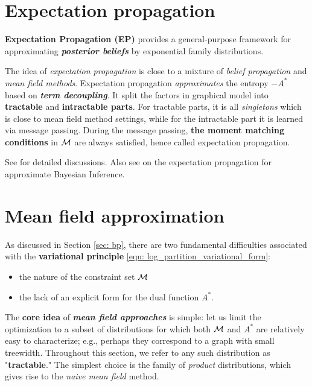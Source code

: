 \documentclass[11pt]{article}
\begin{document}
\section{Expectation propagation}
\textbf{Expectation Propagation (EP)} \citep{seeger2005expectation, wainwright2008graphical, koller2009probabilistic} provides a general-purpose framework for approximating \textbf{\emph{posterior beliefs}} by exponential family distributions. 

The idea of \emph{expectation propagation} is close to a mixture of \emph{belief propagation} and \emph{mean field methods}. Expectation propagation \emph{approximates} the entropy $-A^{*}$ based on \emph{\textbf{term decoupling}}. It split the factors in graphical model into \textbf{tractable} and \textbf{intractable parts}. For tractable parts, it is all \emph{singletons} which is close to mean field method settings, while for the intractable part it is learned via message passing.  During the message passing, \textbf{the moment matching conditions} in ${\mathcal M}$ are always satisfied, hence called expectation propagation.

See \citep{seeger2005expectation, wainwright2008graphical, koller2009probabilistic} for detailed discussions. Also see \citep{minka2013expectation} on the expectation propagation for approximate Bayesian Inference.



\newpage
\section{Mean field approximation}
As discussed in Section \ref{sec: bp}, there are two fundamental difficulties associated with the \textbf{variational principle} \eqref{eqn: log_partition_variational_form}:
\begin{itemize}
\item the nature of the constraint set ${\mathcal M}$

\item the lack of an explicit form for the dual function $A^{*}$.
\end{itemize}

The \textbf{core idea} of \emph{\textbf{mean field approaches}} is simple: let us limit the optimization to a subset of distributions for which both ${\mathcal M}$ and $A^{*}$ are relatively easy to characterize; e.g., perhaps they correspond to a graph with small treewidth. Throughout this section, we refer to any such distribution as "\textbf{tractable}." The simplest choice is the family of \emph{product} distributions, which gives rise to the \emph{naive mean field} method.
\end{document}
